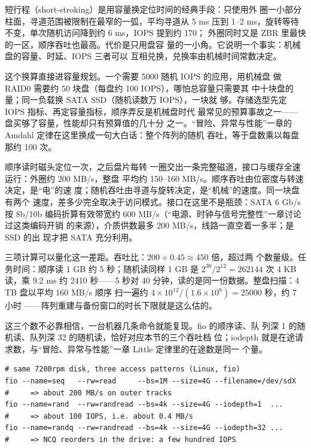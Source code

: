 短行程（short-stroking）是用容量换定位时间的经典手段：只使用外
圈一小部分柱面，寻道范围被限制在最窄的一弧，平均寻道从 5 ms 压到
1--2 ms，旋转等待不变，单次随机访问降到约 6 ms，IOPS 提到约 170；
外圈同时又是 ZBR 里最快的一区，顺序吞吐也最高。代价是只用盘容
量的一小角。它说明一个事实：机械盘的容量、时延、IOPS 三者可以
互相兑换，兑换率由机械时间常数决定。

这个换算直接进容量规划。一个需要 5000 随机 IOPS 的应用，用机械盘
做 RAID0 需要约 50 块盘（每盘约 100 IOPS），哪怕总容量只需要其
中十块盘的量；同一负载换 SATA SSD（随机读数万 IOPS），一块就
够。存储选型先定 IOPS 指标、再定容量指标，顺序弄反是机械盘时代
最常见的预算事故之一——盘买够了容量，性能却只有预算值的几十分
之一。“冒险、异常与性能”一章的 Amdahl 定律在这里换成一句大白话：整个阵列的随机
吞吐，等于盘数乘以每盘那约 100 次。

顺序读时磁头定位一次，之后盘片每转
一圈交出一条完整磁道，接口与缓存全速运行：外圈约 200 MB/s，整盘
平均约 150--160 MB/s。顺序吞吐由位密度与转速决定，是“电”的速
度；随机吞吐由寻道与旋转决定，是“机械”的速度。同一块盘有两个
速度，差多少完全取决于访问模式。接口在这里不是瓶颈：SATA 6 Gb/s
按 8b/10b 编码折算有效带宽约 600 MB/s（“电源、时钟与信号完整性”一章讨论过这类编码开销
的来源），介质供数最多 200 MB/s，线路一直空着一多半；是 SSD 的出
现才把 SATA 充分利用。

三项计算可以量化这一差距。吞吐比：$200\div0.45\approx450$ 倍，超过两
个数量级。任务时间：顺序读 1 GB 约 5 秒；随机读同样 1 GB 是
$2^{30}/2^{12}=262144$ 次 4 KB 读，乘 9.2 ms 约 2410 秒——5 秒对
40 分钟，读的是同一份数据。整盘扫描：4 TB 盘以平均 160 MB/s 顺序
扫一遍约 $4\times10^{12}/(1.6\times10^{8})=25000$ 秒，约 7 小时
——阵列重建与备份窗口的时长下限就是这么估的。

这三个数不必靠相信，一台机器几条命令就能复现。fio 的顺序读、队
列深 1 的随机读、队列深 32 的随机读，恰好对应本节的三个吞吐档
位；iodepth 就是在途请求数，与“冒险、异常与性能”一章 Little 定律里的在途数是同一
个量。

\begin{lstlisting}
# same 7200rpm disk, three access patterns (Linux, fio)
fio --name=seq   --rw=read     --bs=1M --size=4G --filename=/dev/sdX
#     => about 200 MB/s on outer tracks
fio --name=rand  --rw=randread --bs=4k --size=4G --iodepth=1  ...
#     => about 100 IOPS, i.e. about 0.4 MB/s
fio --name=randq --rw=randread --bs=4k --size=4G --iodepth=32 ...
#     => NCQ reorders in the drive: a few hundred IOPS
\end{lstlisting}

